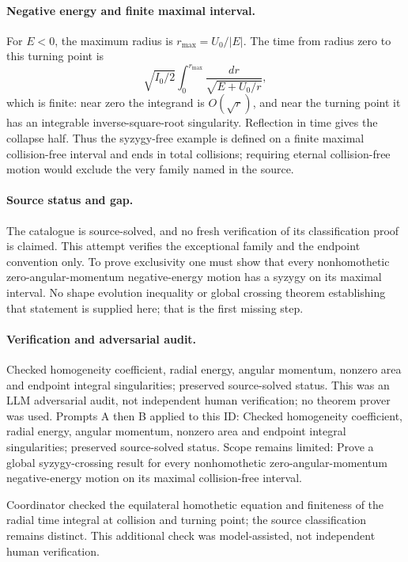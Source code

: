 \documentclass[11pt]{article}
\begin{document}
\paragraph{Negative energy and finite maximal interval.}For \(E<0\), the maximum radius is \(r_{\max}=U_0/|E|\). The time from radius zero to this turning point is
\[\sqrt{I_0/2}\int_0^{r_{\max}}\frac{dr}{\sqrt{E+U_0/r}},
\]
which is finite: near zero the integrand is \(O(\sqrt r)\), and near the turning point it has an integrable inverse-square-root singularity. Reflection in time gives the collapse half. Thus the syzygy-free example is defined on a finite maximal collision-free interval and ends in total collisions; requiring eternal collision-free motion would exclude the very family named in the source.
\paragraph{Source status and gap.}The catalogue is source-solved, and no fresh verification of its classification proof is claimed. This attempt verifies the exceptional family and the endpoint convention only. To prove exclusivity one must show that every nonhomothetic zero-angular-momentum negative-energy motion has a syzygy on its maximal interval. No shape evolution inequality or global crossing theorem establishing that statement is supplied here; that is the first missing step.

\paragraph{Verification and adversarial audit.}
Checked homogeneity coefficient, radial energy, angular momentum, nonzero area and endpoint integral singularities; preserved source-solved status. This was an LLM adversarial audit, not independent human verification; no theorem prover was used. Prompts A then B applied to this ID: Checked homogeneity coefficient, radial energy, angular momentum, nonzero area and endpoint integral singularities; preserved source-solved status. Scope remains limited: Prove a global syzygy-crossing result for every nonhomothetic zero-angular-momentum negative-energy motion on its maximal collision-free interval.

Coordinator checked the equilateral homothetic equation and finiteness of the radial time integral at collision and turning point; the source classification remains distinct. This additional check was model-assisted, not independent human verification.
\end{document}
